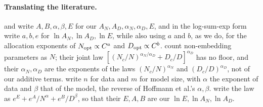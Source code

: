 \begin{refsection}
\paragraph{Translating the literature.} \Textcite{HoffmannEtAl2022} and \textcite{BesirogluEtAl2024} write $A,B,\alpha,\beta,E$ for our $A_N,A_D,\alpha_N,\alpha_D,E$, and in the log-sum-exp form write $a,b,e$ for $\ln A_N,\ln A_D,\ln E$, while also using $a$ and $b$, as we do, for the allocation exponents of $N_{\mathrm{opt}}\propto C^a$ and $D_{\mathrm{opt}}\propto C^b$. \Textcite{KaplanEtAl2020} count non-embedding parameters as $N$; their joint law $[(N_c/N)^{\alpha_N/\alpha_D}+D_c/D]^{\alpha_D}$ has no floor, and their $\alpha_N,\alpha_D$ are the exponents of the laws $(N_c/N)^{\alpha_N}$ and $(D_c/D)^{\alpha_D}$, not of our additive terms. \Textcite{RosenfeldEtAl2020} write $n$ for data and $m$ for model size, with $\alpha$ the exponent of data and $\beta$ that of the model, the reverse of Hoffmann et al.'s $\alpha,\beta$. \Textcite{ChoshenEtAl2025} write the law as $e^{E}+e^{A}/N^{\alpha}+e^{B}/D^{\beta}$, so that their $E,A,B$ are our $\ln E,\ln A_N,\ln A_D$.

\printchapterbib
\end{refsection}
